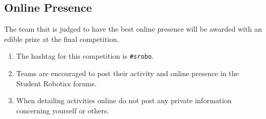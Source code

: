 \subsection{Online Presence}
The team that is judged to have the best online presence will be awarded with an edible prize at the final competition.
\begin{enumerate}
\item The hashtag for this competition is \texttt{\#srobo\sryear{}}.
\item Teams are encouraged to post their activity and online presence in the Student Robotics forums.
\item When detailing activities online do not post any private information concerning yourself or others.
\end{enumerate}
